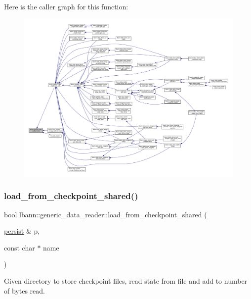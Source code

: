 Here is the caller graph for this function\+:\nopagebreak
\begin{figure}[H]
\begin{center}
\leavevmode
\includegraphics[width=350pt]{classlbann_1_1generic__data__reader_afeb47703d988a230a59859cbfc178215_icgraph}
\end{center}
\end{figure}
\mbox{\label{classlbann_1_1generic__data__reader_a85119fae17feb8fda32f8a2f40869436}} 
\subsubsection{\texorpdfstring{load\+\_\+from\+\_\+checkpoint\+\_\+shared()}{load\_from\_checkpoint\_shared()}}
{\footnotesize\ttfamily bool lbann\+::generic\+\_\+data\+\_\+reader\+::load\+\_\+from\+\_\+checkpoint\+\_\+shared (\begin{DoxyParamCaption}\item[{\hyperlink{classlbann_1_1persist}{persist} \&}]{p,  }\item[{const char $\ast$}]{name }\end{DoxyParamCaption})}



Given directory to store checkpoint files, read state from file and add to number of bytes read. 



